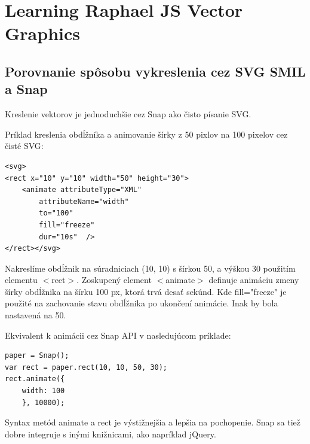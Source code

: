 \newpage
\section{Learning Raphael JS Vector Graphics}


\subsection{Porovnanie spôsobu vykreslenia cez SVG SMIL a Snap}

Kreslenie vektorov je jednoduchšie cez Snap ako čisto písanie SVG. 

Príklad kreslenia obdĺžníka a animovanie šírky z 50 pixlov na 100 pixelov cez čisté SVG:\cite[p.~9]{Dawber}
\begin{lstlisting}
<svg>
<rect x="10" y="10" width="50" height="30">
	<animate attributeType="XML"
		attributeName="width"
		to="100"
		fill="freeze"
		dur="10s"  />
</rect></svg>
\end{lstlisting}

Nakreslíme obdĺžnik na súradniciach (10, 10) s šírkou 50, a výškou 30 použitím elementu $<$rect$>$. Zoskupený element $<$animate$>$ definuje animáciu zmeny šírky obdĺžnika na šírku 100 px, ktorá trvá desať sekúnd. Kde fill="freeze" je použité na zachovanie stavu obdĺžnika po ukončení animácie. Inak by bola nastavená na 50. 

Ekvivalent k animácii cez Snap API v nasledujúcom príklade:

\begin{lstlisting}
paper = Snap();
var rect = paper.rect(10, 10, 50, 30);
rect.animate({
	width: 100
	}, 10000);
\end{lstlisting}

Syntax metód animate a rect je výstižnejšia a lepšia na pochopenie. Snap sa tiež dobre integruje s inými knižnicami, ako napríklad jQuery. 


\newpage
%


